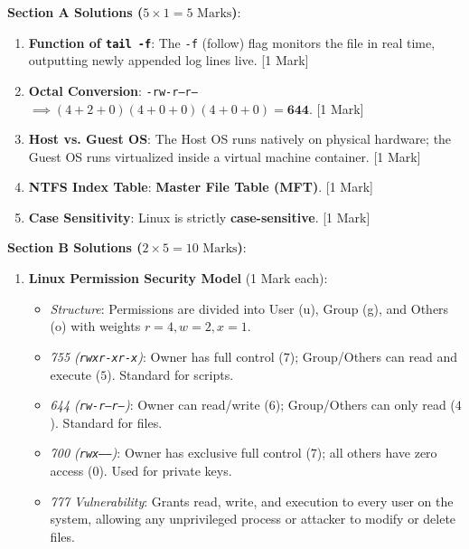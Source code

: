 \begin{solutionbox}
\noindent\textbf{Section A Solutions ($5 \times 1 = 5\text{ Marks}$)}:
\begin{enumerate}
    \item \textbf{Function of \texttt{tail -f}}: The \texttt{-f} (follow) flag monitors the file in real time, outputting newly appended log lines live. [1 Mark]
    \item \textbf{Octal Conversion}: \texttt{-rw-r--r--} $\implies (4+2+0)(4+0+0)(4+0+0) = \mathbf{644}$. [1 Mark]
    \item \textbf{Host vs. Guest OS}: The Host OS runs natively on physical hardware; the Guest OS runs virtualized inside a virtual machine container. [1 Mark]
    \item \textbf{NTFS Index Table}: \textbf{Master File Table (MFT)}. [1 Mark]
    \item \textbf{Case Sensitivity}: Linux is strictly \textbf{case-sensitive}. [1 Mark]
\end{enumerate}

\medskip
\noindent\textbf{Section B Solutions ($2 \times 5 = 10\text{ Marks}$)}:
\begin{enumerate}[start=6]
    \item \textbf{Linux Permission Security Model} (1 Mark each):
    \begin{itemize}
        \item \textit{Structure}: Permissions are divided into User (u), Group (g), and Others (o) with weights $r=4, w=2, x=1$.
        \item \textit{755 (\texttt{rwxr-xr-x})}: Owner has full control ($7$); Group/Others can read and execute ($5$). Standard for scripts.
        \item \textit{644 (\texttt{rw-r--r--})}: Owner can read/write ($6$); Group/Others can only read ($4$). Standard for files.
        \item \textit{700 (\texttt{rwx------})}: Owner has exclusive full control ($7$); all others have zero access ($0$). Used for private keys.
        \item \textit{777 Vulnerability}: Grants read, write, and execution to every user on the system, allowing any unprivileged process or attacker to modify or delete files.
    \end{itemize}


\end{enumerate}
\end{solutionbox}
